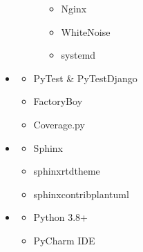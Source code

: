 \documentclass[a4paper,12pt,ngerman]{sphinxmanual}
\begin{document}
\begin{itemize}
\begin{description}
\begin{itemize}
\item {} 
\sphinxAtStartPar
Nginx

\item {} 
\sphinxAtStartPar
WhiteNoise

\item {} 
\sphinxAtStartPar
systemd

\end{itemize}

\end{description}

\item {} \begin{description}
\begin{itemize}
\item {} 
\sphinxAtStartPar
PyTest \& PyTest\sphinxhyphen{}Django

\item {} 
\sphinxAtStartPar
FactoryBoy

\item {} 
\sphinxAtStartPar
Coverage.py

\end{itemize}

\end{description}

\item {} \begin{description}
\begin{itemize}
\item {} 
\sphinxAtStartPar
Sphinx

\item {} 
\sphinxAtStartPar
sphinx\sphinxhyphen{}rtd\sphinxhyphen{}theme

\item {} 
\sphinxAtStartPar
sphinxcontrib\sphinxhyphen{}plantuml

\end{itemize}

\end{description}

\item {} \begin{description}
\begin{itemize}
\item {} 
\sphinxAtStartPar
Python 3.8+

\item {} 
\sphinxAtStartPar
PyCharm IDE


\end{itemize}
\end{description}
\end{itemize}
\end{document}
